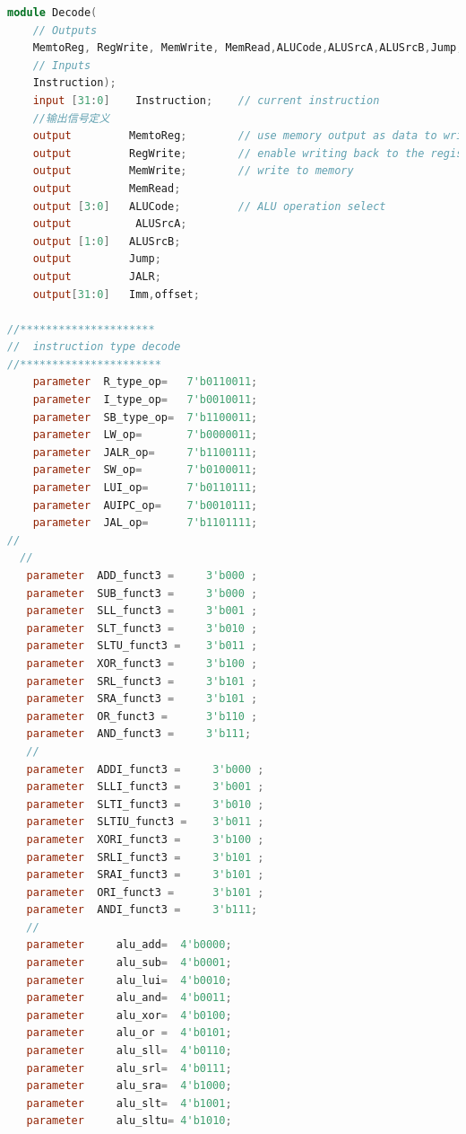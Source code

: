 \documentclass[12pt,hyperref,a4paper,UTF8]{ctexart}
\begin{document}
\begin{lstlisting}[language=Verilog,caption=Decode模块定义]
module Decode(   
	// Outputs
	MemtoReg, RegWrite, MemWrite, MemRead,ALUCode,ALUSrcA,ALUSrcB,Jump,JALR,Imm,offset,
	// Inputs 
    Instruction);
	input [31:0]	Instruction;	// current instruction
    //输出信号定义
	output		   MemtoReg;		// use memory output as data to write into register
	output		   RegWrite;		// enable writing back to the register
	output		   MemWrite;		// write to memory
	output         MemRead;
	output [3:0]   ALUCode;         // ALU operation select
	output      	ALUSrcA;
	output [1:0]   ALUSrcB;
	output         Jump;
	output         JALR;
	output[31:0]   Imm,offset;
	
//*********************
//  instruction type decode
//**********************
	parameter  R_type_op=   7'b0110011;
	parameter  I_type_op=   7'b0010011;
	parameter  SB_type_op=  7'b1100011;
	parameter  LW_op=       7'b0000011;
	parameter  JALR_op=     7'b1100111;
	parameter  SW_op=       7'b0100011;
	parameter  LUI_op=      7'b0110111;
	parameter  AUIPC_op=    7'b0010111;	
	parameter  JAL_op=      7'b1101111;	
//
  //
   parameter  ADD_funct3 =     3'b000 ;
   parameter  SUB_funct3 =     3'b000 ;
   parameter  SLL_funct3 =     3'b001 ;
   parameter  SLT_funct3 =     3'b010 ;
   parameter  SLTU_funct3 =    3'b011 ;
   parameter  XOR_funct3 =     3'b100 ;
   parameter  SRL_funct3 =     3'b101 ;
   parameter  SRA_funct3 =     3'b101 ;
   parameter  OR_funct3 =      3'b110 ;
   parameter  AND_funct3 =     3'b111;
   //
   parameter  ADDI_funct3 =     3'b000 ;
   parameter  SLLI_funct3 =     3'b001 ;
   parameter  SLTI_funct3 =     3'b010 ;
   parameter  SLTIU_funct3 =    3'b011 ;
   parameter  XORI_funct3 =     3'b100 ;
   parameter  SRLI_funct3 =     3'b101 ;
   parameter  SRAI_funct3 =     3'b101 ;
   parameter  ORI_funct3 =      3'b101 ;
   parameter  ANDI_funct3 =     3'b111;
   //
   parameter	 alu_add=  4'b0000;
   parameter	 alu_sub=  4'b0001;
   parameter	 alu_lui=  4'b0010;
   parameter	 alu_and=  4'b0011;
   parameter	 alu_xor=  4'b0100;
   parameter	 alu_or =  4'b0101;
   parameter 	 alu_sll=  4'b0110;
   parameter	 alu_srl=  4'b0111;
   parameter	 alu_sra=  4'b1000;
   parameter	 alu_slt=  4'b1001;
   parameter	 alu_sltu= 4'b1010; 
\end{lstlisting}
\end{document}
